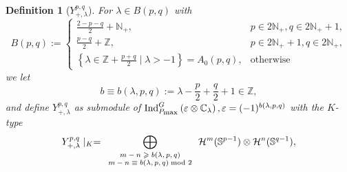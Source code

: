 \documentclass[12pt]{article} %
\theoremstyle{plain}
\newtheorem{definition}{Definition}
\theoremstyle{remark}
\newcommand{\tmscript}[1]{ {\scriptsize #1} }
\newcommand{\assign}{:=}
\newcommand{\myInd}[1]{\mbox{Ind}_{P_{\mbox{\scriptsize\normalfont max}}}^G\left( \varepsilon\otimes \C_{#1} \right)}
\begin{document}
\begin{definition}[$Y_{+,\lambda}^{p,q}$]
	For $\lambda\in B(p,q)$ with\begin{equation*}
		B (p, q) \assign \left\{ \begin{array}{ll}
    \frac{2 - p - q}{2} +\mathbb{N}_+, & p \in 2\mathbb{N}_+, q \in
    2\mathbb{N}_+ + 1,\\
    \frac{p - q}{2} +\mathbb{Z}, & p \in 2\mathbb{N}_+ + 1, q \in
    2\mathbb{N}_+,\\
    \left\{ \lambda \in \mathbb{Z}+ \frac{p + q}{2} \mid \lambda > - 1
    \right\} = A_0 (p, q), & \mbox{otherwise}
  \end{array} \right. 
	\end{equation*}
	we let
	\begin{equation}
	b \equiv b (\lambda, p, q) \assign \lambda - \frac{p}{2} + \frac{q}{2} +
  1 \in \mathbb{Z},  \label{eqn:20-beplus} 	
	\end{equation}
	and define $Y_{+,\lambda}^{p,q}$ as submodule of $\myInd{\lambda},\varepsilon=(-1)^{b(\lambda,p,q)}$ with the $K$-type
	\begin{equation*}
		\begin{array}[]{c}
   Y_{+, \lambda}^{p, q} \mid_K = \displaystyle\bigoplus_{\tmscript{\begin{array}{c}
    m - n \geqslant b (\lambda, p, q)\\
    m - n \equiv b (\lambda, p, q) \mbox{\normalfont\;mod } 2
  \end{array}}} \mathcal{H}^m (\mathbb{S}^{p - 1}) \otimes \mathcal{H}^n
  (\mathbb{S}^{q - 1}),\\
		\end{array}
	\end{equation*}
\end{definition}
\end{document}
